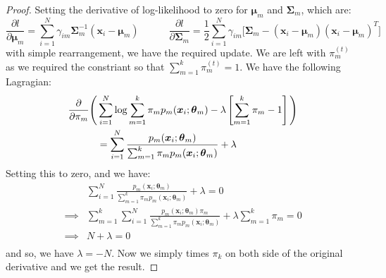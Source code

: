 \begin{proof}
    Setting the derivative of log-likelihood to zero for $\boldsymbol \mu_m$ and $\boldsymbol \Sigma_m$, which are:
    \begin{equation*}
        \frac{\partial l}{\partial\boldsymbol\mu_m} = \sum^N_{i=1}\gamma_{im}\boldsymbol \Sigma_m^{-1}(\boldsymbol x_i - \boldsymbol \mu_m) \qquad \quad
        \frac{\partial l}{\partial\boldsymbol\Sigma_m} = \frac{1}{2}\sum^N_{i=1}\gamma_{im}\Big[\boldsymbol \Sigma_m - (\boldsymbol x_i - \boldsymbol \mu_m)(\boldsymbol x_i - \boldsymbol \mu_m)^T\Big]
    \end{equation*}
    with simple rearrangement, we have the required update. We are left with $\pi^{(t)}_m$ as we required the constriant so that $\sum^k_{m=1}\pi^{(t)}_m = 1$. We have the following Lagragian:
    \begin{equation*}
    \begin{aligned} 
        \frac{\partial}{\partial \pi_m} \Bigg( &\sum^N_{i=1}\log\sum^k_{m=1}\pi_m p_m(\boldsymbol x_i ; \boldsymbol \theta_m) - \lambda \left[ \sum^k_{m=1}\pi_m - 1 \right] \Bigg) \\
        &= \sum^N_{i=1}\frac{p_m(\boldsymbol x_i ; \boldsymbol \theta_m)}{\sum^k_{m=1}\pi_m p_m(\boldsymbol x_i ; \boldsymbol \theta_m)} + \lambda
    \end{aligned}
    \end{equation*}
    Setting this to zero, and we have:
    \begin{equation*}
    \begin{aligned} 
        &\sum^N_{i=1}\frac{p_m(\boldsymbol x_i ; \boldsymbol \theta_m)}{\sum^k_{m=1}\pi_m p_m(\boldsymbol x_i ; \boldsymbol \theta_m)} + \lambda = 0\\
        \implies&\sum^k_{m=1}\sum^N_{i=1}\frac{p_m(\boldsymbol x_i ; \boldsymbol \theta_m)\pi_m}{\sum^k_{m=1}\pi_m p_m(\boldsymbol x_i ; \boldsymbol \theta_m)} + \lambda\sum^k_{m=1}\pi_m = 0\\
        \implies&N+ \lambda = 0\\
    \end{aligned}
    \end{equation*}
    and so, we have $\lambda = -N$. Now we simply times $\pi_k$ on both side of the original derivative and we get the result. 
\end{proof}


